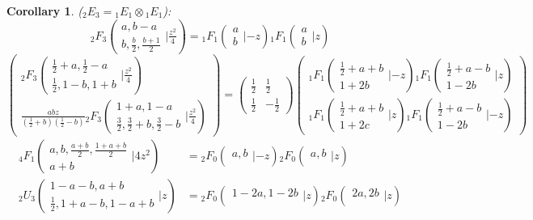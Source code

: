 \documentclass[12pt]{article}
\numberwithin{equation}{section}
\newtheorem{corollary}[theorem]{Corollary}
\newcommand{\Head}[3] {{}_{#1}{#2}_{#3}}
\newcommand{\ArgS}[3] {( \begin{smallmatrix} #1 \\ #2 \end{smallmatrix} | {#3})}
\begin{document}
\begin{corollary}
($\Head{2}{E}{3} = \Head{1}{E}{1} \otimes \Head{1}{E}{1}$):
\begin{equation*}
\Head{2}{F}{3} \ArgS{a, b - a}{b, \frac{b}{2}, \frac{b + 1}{2}}{\tfrac{z^2}{4}} = \Head{1}{F}{1} \ArgS{a}{b}{-z} \Head{1}{F}{1} \ArgS{a}{b}{z}
\end{equation*}
\begin{equation*}
\left(\begin{array}{r}
\Head{2}{F}{3} \ArgS{\frac12+a,\frac12-a}{\frac{1}{2}, 1-b, 1+b}{\tfrac{z^2}{4}}\\
\frac{a b z}{(\frac12+b)(\frac12-b)} \Head{2}{F}{3} \ArgS{1+a,1-a}{\frac32, \frac32+b, \frac32-b}{\tfrac{z^2}{4}}
\end{array}\right)
 =
\begin{pmatrix}
\tfrac12 & \tfrac12 \\
\tfrac12 & -\tfrac12
\end{pmatrix}
\begin{pmatrix}
\Head{1}{F}{1}\ArgS{\frac12+a+b}{1+2b}{-z} \Head{1}{F}{1}\ArgS{\frac12+a-b}{1-2b}{z}
\\
\Head{1}{F}{1} \ArgS{\frac12+a+b}{1+2c}{z}\Head{1}{F}{1} \ArgS{\frac12+a-b}{1-2b}{-z} \end{pmatrix}
\end{equation*}
\begin{align*}
\Head{4}{F}{1} \ArgS{a, b, \frac{a+b}{2}, \frac{1+a+b}{2}}{a + b}{4 z^2} &= \Head{2}{F}{0} \ArgS{a, b}{}{-z}\Head{2}{F}{0}\ArgS{a, b}{}{z}\\
\Head{2}{U}{3} \ArgS{1 - a - b, a + b}{\frac12, 1 + a - b, 1 - a + b}{z} &= \Head{2}{F}{0} \ArgS{1 - 2 a, 1 - 2 b}{}{z} \Head{2}{F}{0} \ArgS{2 a, 2 b} {}{z} 
\end{align*}
\end{corollary}
\end{document}
